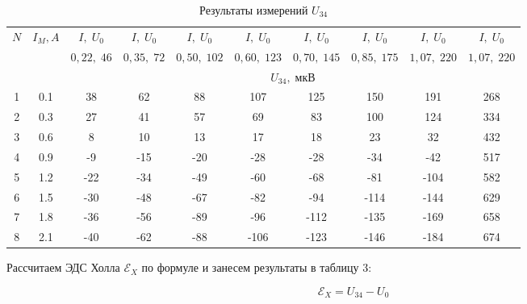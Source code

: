 \documentclass[12pt]{kiarticle}
\newcommand{\eds}{\ensuremath{ \mathscr{E}}}
\begin{document}
\begin{enumerate}
  \begin{table}[h!]
  	\centering
  	\caption{Результаты измерений $ U_{34} $}
  	\begin{tabularx}{\textwidth}{|c|c|c|c|c|c|c|c|c|c|}
  		\hline
  		\multirow{3}{*}{$ N $} & \multirow{3}{*}{$ I_M, A $} & 
  		$I, \; U_0 $ &
  			$I, \;U_0 $ &
  			$I, \;U_0 $ &
  		$I, \;U_0 $ &
  		$I, \;U_0 $ & 
  		$I, \;U_0 $ &
  		$I, \;U_0 $ &
  			$I, \;U_0 $ 
  		\\
  		& &
  		 $0,22,  \;46$ &
  		$ 0,35,  \;72 $ &
  		   $  0,50, \;102$ &
  		     $  0,60,  \;123$ &
  		     $ 0,70,  \;145$ & 
  		      $ 0,85, \; 175$ &
  		      $  1,07,  \;220 $  &
  		      $ 1,07,\; 220 $
  		       \\
  		       \cline{3-10}
  		       & & \multicolumn{8}{|c|}{$ U_{34}, \; мкВ $} \\
  		       \hline
  		 1& 0.1& 38 & 62 & 88 & 107 & 125 & 150 & 191 & 268 \\
  		2 & 0.3 & 27 & 41 & 57 & 69 & 83 & 100 & 124 & 334 \\
  		3 & 0.6 & 8 & 10 & 13 & 17 & 18 & 23 & 32 & 432 \\
  		4 & 0.9 & -9 & -15 & -20 & -28 & -28 & -34 & -42 & 517 \\
  		5 & 1.2 & -22 & -34 & -49 & -60 & -68 & -81 & -104 & 582 \\
  		6 & 1.5 & -30 & -48 & -67 & -82 & -94 & -114 & -144 & 629 \\
  		7 & 1.8 & -36 & -56 & -89 & -96 & -112 & -135 & -169 & 658 \\
  		8 & 2.1 & -40 & -62 & -88 & -106 & -123 & -146 & -184 & 674 \\
  		\hline
  	\end{tabularx}
  	\label{resU}%
  \end{table}%
  
  Рассчитаем ЭДС Холла $ \eds_X $ по формуле и занесем результаты в таблицу 3:
  
  \begin{equation}\label{}
  \eds_X = U_{34} - U_0
  \end{equation}
  

\end{enumerate}
\end{document}
